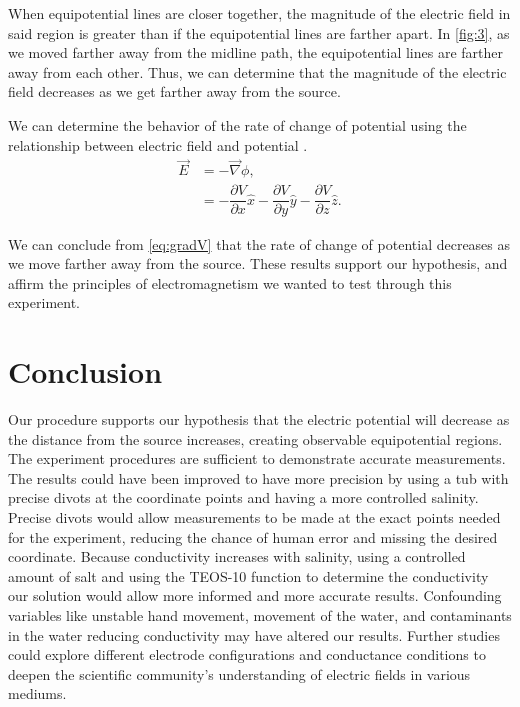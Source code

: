 ﻿\documentclass[10pt,journal,twoside]{IEEEtran}
\begin{document}
When equipotential lines are closer together, the magnitude of the electric field in said region is greater than if the equipotential lines are farther apart. In \cref{fig:3}, as we moved farther away from the midline path, the equipotential lines are farther away from each other. Thus, we can determine that the magnitude of the electric field decreases as we get farther away from the source.

We can determine the behavior of the rate of change of potential using the relationship between electric field and potential \cite{tipler,stewart}.
\begin{align}
\vec{E} &= - \vec{\nabla} \phi, \\
&= - \dfrac{\partial V}{\partial x} \hat{x} - \dfrac{\partial V}{\partial y} \hat{y} - \dfrac{\partial V}{\partial z} \hat{z}.
\label{eq:gradV}
\end{align}

We can conclude from \cref{eq:gradV} that the rate of change of potential decreases as we move farther away from the source. These results support our hypothesis, and affirm the principles of electromagnetism we wanted to test through this experiment. 





\section{Conclusion}
Our procedure supports our hypothesis that the electric potential will decrease as the distance from the source increases, creating observable equipotential regions. The experiment procedures are sufficient to demonstrate accurate measurements. The results could have been improved to have more precision by using a tub with precise divots at the coordinate points and having a more controlled salinity. Precise divots would allow measurements to be made at the exact points needed  for the experiment, reducing the chance of human error and missing the desired coordinate. Because conductivity increases with salinity, using a controlled amount of salt and using the TEOS-10 function \cite{heilman-2023-data} to determine the conductivity our solution would allow more informed and more accurate results. Confounding variables like unstable hand movement, movement of the water, and contaminants in the water reducing conductivity may have altered our results. Further studies could explore different electrode configurations and conductance conditions to deepen the scientific community’s understanding of electric fields in various mediums.
        
\end{document}
